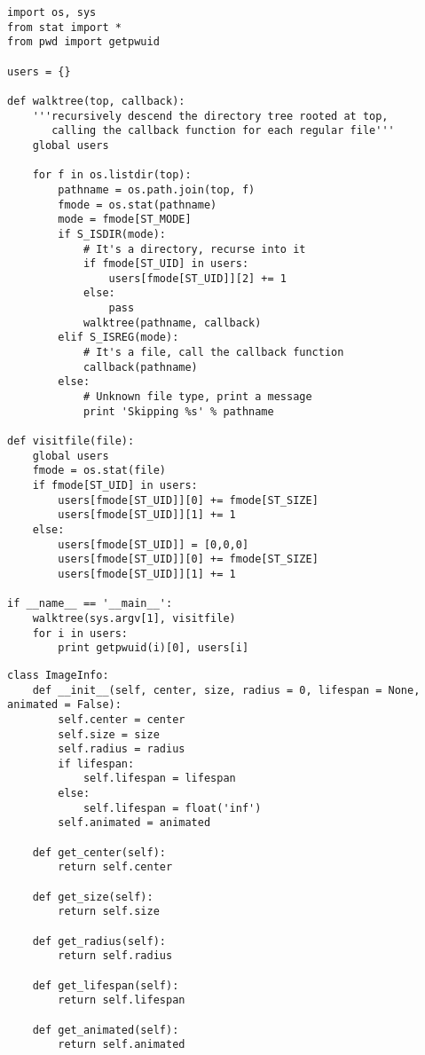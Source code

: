 \documentclass[9pt]{amsart}
\begin{document}
\begin{multicols}{2}
\begin{lstlisting}
import os, sys
from stat import *
from pwd import getpwuid

users = {}

def walktree(top, callback):
    '''recursively descend the directory tree rooted at top,
       calling the callback function for each regular file'''
    global users

    for f in os.listdir(top):
        pathname = os.path.join(top, f)
        fmode = os.stat(pathname)
        mode = fmode[ST_MODE]
        if S_ISDIR(mode):
            # It's a directory, recurse into it
            if fmode[ST_UID] in users:
                users[fmode[ST_UID]][2] += 1
            else:
                pass
            walktree(pathname, callback)
        elif S_ISREG(mode):
            # It's a file, call the callback function
            callback(pathname)
        else:
            # Unknown file type, print a message
            print 'Skipping %s' % pathname

def visitfile(file):
    global users
    fmode = os.stat(file)
    if fmode[ST_UID] in users:
        users[fmode[ST_UID]][0] += fmode[ST_SIZE]
        users[fmode[ST_UID]][1] += 1
    else:
        users[fmode[ST_UID]] = [0,0,0]
        users[fmode[ST_UID]][0] += fmode[ST_SIZE]
        users[fmode[ST_UID]][1] += 1

if __name__ == '__main__':
    walktree(sys.argv[1], visitfile)
    for i in users:
        print getpwuid(i)[0], users[i]
\end{lstlisting}        

\noindent {\textcolor {blue} {\em OO programming}}   

\begin{lstlisting}
class ImageInfo:
    def __init__(self, center, size, radius = 0, lifespan = None, animated = False):
        self.center = center
        self.size = size
        self.radius = radius
        if lifespan:
            self.lifespan = lifespan
        else:
            self.lifespan = float('inf')
        self.animated = animated

    def get_center(self):
        return self.center

    def get_size(self):
        return self.size

    def get_radius(self):
        return self.radius

    def get_lifespan(self):
        return self.lifespan

    def get_animated(self):
        return self.animated


\end{lstlisting}
\end{multicols}
\end{document}

